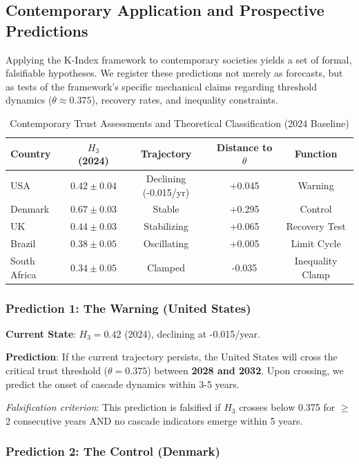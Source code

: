 \documentclass[11pt,a4paper]{article}
\newcommand{\Hthree}{H_3}
\begin{document}
\subsection{Contemporary Application and Prospective Predictions}

Applying the K-Index framework to contemporary societies yields a set of formal, falsifiable hypotheses. We register these predictions not merely as forecasts, but as tests of the framework's specific mechanical claims regarding threshold dynamics ($\theta \approx 0.375$), recovery rates, and inequality constraints.

\begin{table}[H]
\centering
\caption{Contemporary Trust Assessments and Theoretical Classification (2024 Baseline)}
\begin{tabular}{lcccc}
\toprule
\textbf{Country} & \textbf{$\Hthree$ (2024)} & \textbf{Trajectory} & \textbf{Distance to $\theta$} & \textbf{Function} \\
\midrule
USA & $0.42 \pm 0.04$ & Declining (-0.015/yr) & +0.045 & Warning \\
Denmark & $0.67 \pm 0.03$ & Stable & +0.295 & Control \\
UK & $0.44 \pm 0.03$ & Stabilizing & +0.065 & Recovery Test \\
Brazil & $0.38 \pm 0.05$ & Oscillating & +0.005 & Limit Cycle \\
South Africa & $0.34 \pm 0.05$ & Clamped & -0.035 & Inequality Clamp \\
\bottomrule
\end{tabular}
\end{table}

\subsubsection{Prediction 1: The Warning (United States)}

\textbf{Current State}: $\Hthree = 0.42$ (2024), declining at -0.015/year.

\textbf{Prediction}: If the current trajectory persists, the United States will cross the critical trust threshold ($\theta = 0.375$) between \textbf{2028 and 2032}. Upon crossing, we predict the onset of cascade dynamics within 3-5 years.

\textit{Falsification criterion}: This prediction is falsified if $\Hthree$ crosses below 0.375 for $\geq$2 consecutive years AND no cascade indicators emerge within 5 years.

\subsubsection{Prediction 2: The Control (Denmark)}
\end{document}
